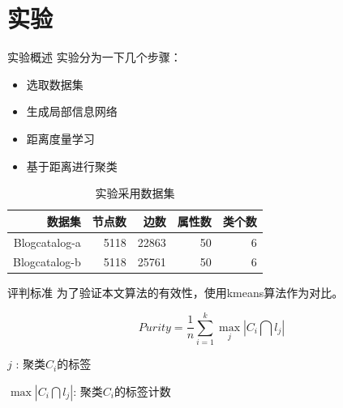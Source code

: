 \documentclass[14pt]{beamer}
\begin{document}
\section{实验}

\begin{frame}{实验概述}
实验分为一下几个步骤：
\begin{itemize}
\item 选取数据集
\item 生成局部信息网络
\item 距离度量学习
\item 基于距离进行聚类
\end{itemize}

\begin{table}[!hpb]
\centering
\caption{实验采用数据集}
    \begin{tabular}{rrrrr} \toprule
    数据集 & 节点数 & 边数  & 属性数 & 类个数\\ \midrule
    Blogcatalog-a & 5118 & 22863 & 50 & 6 \\
    Blogcatalog-b & 5118 & 25761  & 50 & 6 \\ \bottomrule
    \end{tabular}
\end{table}
\end{frame}

\begin{frame}{评判标准}
为了验证本文算法的有效性，使用kmeans算法作为对比。\pause

\[
Purity = \frac{1}{n} \sum_{i=1}^k \operatorname*{max}_j |C_i \bigcap l_j|
\]

$j$ : 聚类$C_i$的标签

$\operatorname*{max} |C_i \bigcap l_j| $: 聚类$C_i$的标签计数

\end{frame}
\end{document}
